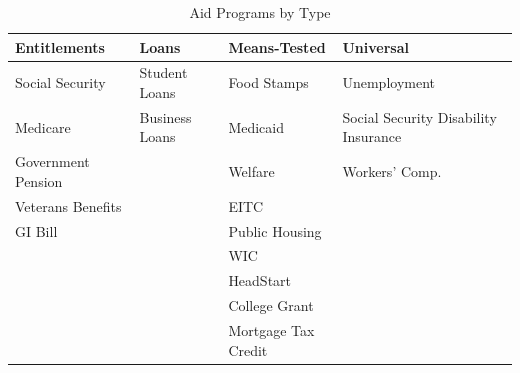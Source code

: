 \documentclass[12pt]{paper}
\begin{document}
\begin{table}[H]
	\begin{adjustbox}{width=1\textwidth}
		\begin{tabular}{llll}
			\hline
			\textbf{Entitlements} & \textbf{Loans} & \textbf{Means-Tested} & \textbf{Universal}                   \\ \hline
			Social Security       & Student Loans  & Food Stamps           & Unemployment                         \\
			Medicare              & Business Loans & Medicaid              & Social Security Disability Insurance \\
			Government Pension    &                & Welfare               & Workers' Comp.                       \\
			Veterans Benefits     &                & EITC                  &                                      \\
			GI Bill               &                & Public Housing        &                                      \\
			&                & WIC                   &                                      \\
			&                & HeadStart             &                                      \\
			&                & College Grant         &                                      \\
			&                & Mortgage Tax Credit   &                                      \\ \hline
		\end{tabular}
	\end{adjustbox}
	\caption{Aid Programs by Type} 
	\label{}
\end{table}
\end{document}
